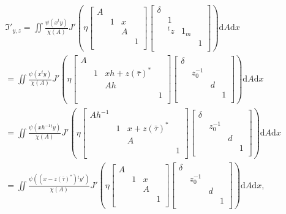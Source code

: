 \documentclass[11pt]{amsart}
\newcommand\If{\mathfrak{I}}
\newcommand\dr{\mathrm{d}}
\newcommand\1{\mathbf{1}}
\numberwithin{equation}{section}
\begin{document}
\begin{align*}
&\If'_{y,z} = \iint \frac{\psi(x{}^ty)}{\chi(A)} J'(\eta \begin{bmatrix}
A & & &  \\
& 1 & x & \\
&  &A  &  \\
& & &1  \\
\end{bmatrix}
\begin{bmatrix}
\delta & & &  \\
& 1& & \\
& {}^tz  &1_m &  \\
& &  &1  \\
\end{bmatrix}) \dr A \dr x \\
&= \iint \frac{\psi(x{}^ty)}{\chi(A)} J'(\eta \begin{bmatrix}
A& & &  \\
& 1 & x h +z(\bar{\tau})^* & \\
&  &A h&  \\
& & &1  \\
\end{bmatrix}
\begin{bmatrix}
\delta & & &  \\
&z_{0}^{-1} & & \\
& & d &  \\
& & &1  \\
\end{bmatrix}) \dr A \dr x  \\
&= 
\iint \frac{\psi(xh^{-1} {}^ty)}{\chi(A)} J'(\eta \begin{bmatrix}
A h^{-1} & & &  \\
& 1 & x +z(\bar{\tau})^* & \\
&  &A &  \\
& & &1  \\
\end{bmatrix}
\begin{bmatrix}
\delta & & &  \\
&z_{0}^{-1} & & \\
& & d &  \\
& & &1  \\
\end{bmatrix}) \dr A \dr x\\
&= 
\iint \frac{\psi((x -z(\bar{\tau})^*){}^ty')}{\chi(A)} J'(\eta\begin{bmatrix}
A & & &  \\
& 1 & x  & \\
&  &A &  \\
& & &1  \\
\end{bmatrix}
\begin{bmatrix}
\delta & & &  \\
&z_{0}^{-1} & & \\
& & d &  \\
& & &1  \\
\end{bmatrix}) \dr A \dr x,
\end{align*} 
\end{document}
